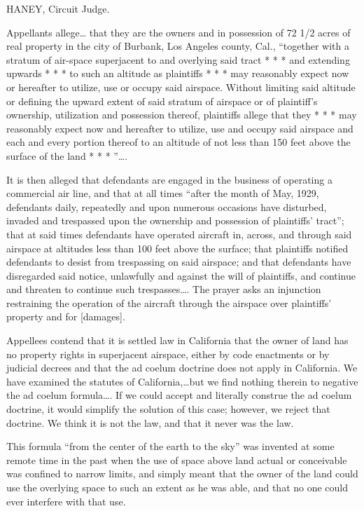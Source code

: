 

HANEY, Circuit Judge.

Appellants allege{\dots} that they are the owners and in possession of 72 1/2
acres of real property in the city of Burbank, Los Angeles county, Cal.,
``together with a stratum of air-space superjacent to and overlying said tract
* * * and extending upwards * * * to such an altitude as plaintiffs * * * may
reasonably expect now or hereafter to utilize, use or occupy said airspace.
Without limiting said altitude or defining the upward extent of said stratum of
airspace or of plaintiff's ownership, utilization and possession thereof,
plaintiffs allege that they * * * may reasonably expect now and hereafter to
utilize, use and occupy said airspace and each and every portion thereof to an
altitude of not less than 150 feet above the surface of the land * * * ''\dots.

It is then alleged that defendants are engaged in the business of operating a
commercial air line, and that at all times ``after the month of May, 1929,
defendants daily, repeatedly and upon numerous occasions have disturbed,
invaded and trespassed upon the ownership and possession of plaintiffs'
tract''; that at said times defendants have operated aircraft in, across, and
through said airspace at altitudes less than 100 feet above the surface; that
plaintiffs notified defendants to desist from trespassing on said airspace; and
that defendants have disregarded said notice, unlawfully and against the will
of plaintiffs, and continue and threaten to continue such trespasses\dots. 
The prayer asks an injunction restraining the operation of the aircraft through
the airspace over plaintiffs' property and for [damages].

Appellees contend that it is settled law in California that the owner of land
has no property rights in superjacent airspace, either by code enactments or by
judicial decrees and that the ad coelum doctrine does not apply in California.
We have examined the statutes of California,\dots but we find nothing therein
to negative the ad coelum formula\dots. If we could accept and literally
construe the ad coelum doctrine, it would simplify the solution of this case;
however, we reject that doctrine. We think it is not the law, and that it never
was the law.

This formula ``from the center of the earth to the sky'' was invented at some
remote time in the past when the use of space above land actual or conceivable
was confined to narrow limits, and simply meant that the owner of the land
could use the overlying space to such an extent as he was able, and that no one
could ever interfere with that use.

